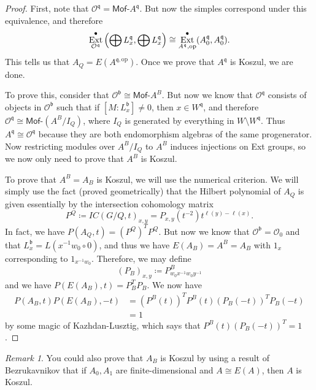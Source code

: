\documentclass[leqno, openany]{memoir}
\theoremstyle{definition}
\theoremstyle{remark}
\newtheorem{rmk}[thm]{Remark}
\theoremstyle{plain}
\theoremstyle{definition}
\theoremstyle{remark}
\newcommand{\cO}{\mathcal{O}}
\renewcommand{\b}{\mathfrak{b}}
\newcommand{\mf}[1]{\mathfrak{#1}}
\newcommand{\mr}[1]{\mathrm{#1}}
\newcommand{\ms}[1]{\mathsf{#1}}
\DeclareMathOperator{\Ext}{Ext}
\begin{document}
\begin{proof}
    First, note that $\cO^{\mf{q}} = \ms{Mof}\text{-}A^{\mf{q}}$. But now the simples correspond under this equivalence, and therefore
    \[ \Ext_{\cO^{\mf{q}}}^{\bullet}\qty(\bigoplus L_x^{\mf{q}}, \bigoplus L_x^{\mf{q}}) \cong \Ext_{A^{\mf{q}}, \mr{op}}^{\bullet}(A_0^{\mf{q}}, A_0^{\mf{q}}). \]
    This tells us that $A_Q = E(A^{\mf{q}, \mr{op}})$. Once we prove that $A^{\mf{q}}$ is Koszul, we are done.

    To prove this, consider that $\cO^{\mf{b}} \cong \ms{Mof}\text{-}A^B$. But now we know that $\cO^{\mf{q}}$ consists of objects in $\cO^{\b}$ such that if $[M : L_x^{\mf{b}}] \neq 0$, then $x \in W^{\mf{q}}$, and therefore $\cO^{\mf{q}} \cong \ms{Mof}\text{-}(A^B/I_Q)$, where $I_Q$ is generated by everything in $W \setminus W^{\mf{q}}$. Thus $A^{\mf{q}} \cong \cO^{\mf{q}}$ because they are both endomorphism algebras of the same progenerator. Now restricting modules over $A^B/I_Q$ to $A^B$ induces injections on Ext groups, so we now only need to prove that $A^B$ is Koszul.

    To prove that $A^B = A_B$ is Koszul, we will use the numerical criterion. We will simply use the fact (proved geometrically) that the Hilbert polynomial of $A_Q$ is given essentially by the intersection cohomology matrix
    \[ P^Q \coloneqq IC(G/Q, t)_{x,y} = P_{x,y}(t^{-2})t^{\ell(y) - \ell(x)}. \]
    In fact, we have $P(A_Q, t) = (P^Q)^T P^Q$. But now we know that $\cO^{\b} = \cO_0$ and that $L_x^{\b} = L(x^{-1}w_0 \circ 0)$, and thus we have $E(A_B) = A^B = A_B$ with $1_x$ corresponding to $1_{x^{-1} w_0}$. Therefore, we may define
    \[ (P_B)_{x,y} \coloneqq P^B_{w_0 x^{-1} w_0 y^{-1}} \]
    and we have $P(E(A_B), t) = P_B^T P_B$. We now have
    \begin{align*}
        P(A_B, t)P(E(A_B), -t) &= (P^B(t))^T P^B(t) (P_B(-t))^T P_B(-t) \\
        &= 1
    \end{align*}
    by some magic of Kazhdan-Lusztig, which says that $P^B(t) (P_B(-t))^T = 1$.
\end{proof}

\begin{rmk}
    You could also prove that $A_B$ is Koszul by using a result of Bezrukavnikov that if $A_0, A_1$ are finite-dimensional and $A \cong E(A)$, then $A$ is Koszul.
\end{rmk}
\end{document}
